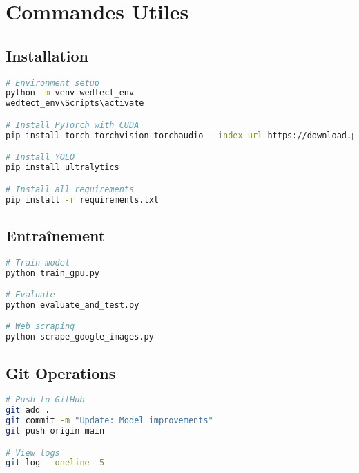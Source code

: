 \documentclass[a4paper,12pt]{report}
\begin{document}
\chapter{Commandes Utiles}

\section{Installation}

\begin{lstlisting}[language=bash]
# Environment setup
python -m venv wedtect_env
wedtect_env\Scripts\activate

# Install PyTorch with CUDA
pip install torch torchvision torchaudio --index-url https://download.pytorch.org/whl/cu118

# Install YOLO
pip install ultralytics

# Install all requirements
pip install -r requirements.txt
\end{lstlisting}

\section{Entraînement}

\begin{lstlisting}[language=bash]
# Train model
python train_gpu.py

# Evaluate
python evaluate_and_test.py

# Web scraping
python scrape_google_images.py
\end{lstlisting}

\section{Git Operations}

\begin{lstlisting}[language=bash]
# Push to GitHub
git add .
git commit -m "Update: Model improvements"
git push origin main

# View logs
git log --oneline -5
\end{lstlisting}
\end{document}
